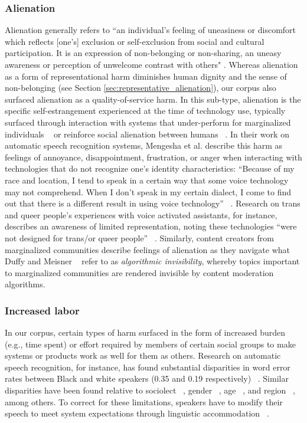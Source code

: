 \subsubsection{Alienation} 
Alienation generally refers to ``an individual's feeling of uneasiness or discomfort which reflects [one's] exclusion or self-exclusion from social and cultural participation. It is an expression of non-belonging or non-sharing, an uneasy awareness or perception of unwelcome contrast with others" \cite[p. 758-759]{hadja1961}. Whereas alienation as a form of representational harm diminishes human dignity and the sense of non-belonging (see Section \ref{sec:representative_alienation}), our corpus also surfaced alienation as a quality-of-service harm. In this sub-type, alienation is the specific self-estrangement experienced at the time of technology use, typically surfaced through interaction with systems that under-perform for marginalized individuals ~\cite{mengesha2021don} or reinforce social alienation between humans ~\cite{Bivens_Haimson_2016}. 
In their work on automatic speech recognition systems, Mengesha et al. describe this harm as feelings of annoyance, disappointment, frustration, or anger when interacting with technologies that do not recognize one’s identity characteristics: “Because of my race and location, I tend to speak in a certain way that some voice technology may not comprehend. When I don’t speak in my certain dialect, I come to find out that there is a different result in using voice technology” ~\cite[p. 5]{mengesha2021don}.
Research on trans and queer people’s experiences with voice activated assistants, for instance, describes an awareness of limited representation, noting these technologies “were not designed for trans/or queer people” ~\cite[p. 8]{Rincon_Keyes_Cath_2021}. Similarly, content creators from marginalized communities describe feelings of alienation as they navigate what Duffy and Meisner ~\cite{Duffy_Meisner_2022} refer to as \textit{algorithmic invisibility}, whereby topics important to marginalized communities are rendered invisible by content moderation algorithms.

\subsubsection{Increased labor} In our corpus, certain types of harm surfaced in the form of increased burden (e.g., time spent) or effort required by members of certain social groups to make systems or products work as well for them as others. Research on automatic speech recognition, for instance, has found substantial disparities in word error rates between Black and white speakers (0.35 and 0.19 respectively) ~\cite{koenecke2020racial}. Similar disparities have been found relative to sociolect ~\cite{aksenova-etal-2021-might}, gender ~\cite{aksenova-etal-2021-might, Tatman_2017}, age ~\cite{Liao_2015}, and region ~\cite{aksenova-etal-2021-might}, among others. To correct for these limitations, speakers have to modify their speech to meet system expectations through linguistic accommodation ~\cite{mengesha2021don}.

